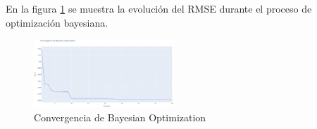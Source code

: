 \documentclass{article}
\begin{document}
En la figura \ref{fig:convergencia_bo} se muestra la evolución del RMSE durante el proceso de optimización bayesiana.

\begin{figure}[H]
\centering
\includegraphics[width=0.47\textwidth]{fig_convergencia_bo.png}  %
\caption{Convergencia de Bayesian Optimization}
\label{fig:convergencia_bo}
\end{figure}
\end{document}
